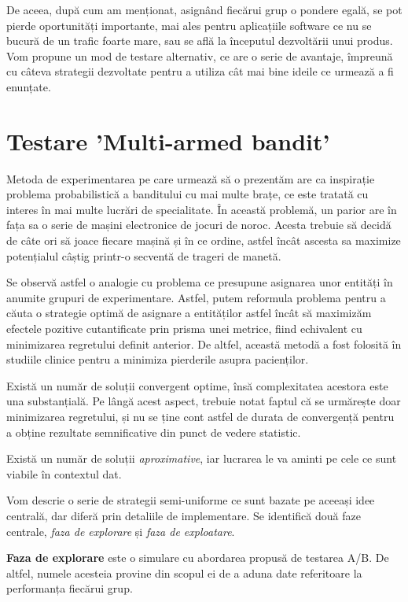 De aceea, după cum am menționat, asignând fiecărui grup o pondere egală, se pot pierde oportunități importante, mai ales pentru aplicațiile software ce nu se bucură de un trafic foarte mare, sau se află la începutul dezvoltării unui produs. Vom propune un mod de testare alternativ, ce are o serie de avantaje, împreună cu câteva strategii dezvoltate pentru a utiliza cât mai bine ideile ce urmează a fi enunțate.

\section{Testare 'Multi-armed bandit'}

Metoda de experimentarea pe care urmează să o prezentăm are ca inspirație problema probabilistică a banditului cu mai multe brațe, ce este tratată cu interes în mai multe lucrări de specialitate. În această problemă, un parior are în fața sa o serie de mașini electronice de jocuri de noroc. Acesta trebuie să decidă de câte ori să joace fiecare mașină și în ce ordine, astfel încât ascesta sa maximize potențialul câștig printr-o secventă de trageri de manetă. 

Se observă astfel o analogie cu problema ce presupune asignarea unor entități în anumite grupuri de experimentare. Astfel, putem reformula problema pentru a căuta o strategie optimă de asignare a entităților astfel încât să maximizăm efectele pozitive cutantificate prin prisma unei metrice, fiind echivalent cu minimizarea regretului definit anterior. De altfel, această metodă a fost folosită în studiile clinice pentru a minimiza pierderile asupra pacienților.

Există un număr de soluții convergent optime, însă complexitatea acestora este una substanțială. Pe lângă acest aspect, trebuie notat faptul că se urmărește doar minimizarea regretului, și nu se ține cont astfel de durata de convergență pentru a obține rezultate semnificative din punct de vedere statistic. 


Există un număr de soluții \textit{aproximative}, iar lucrarea le va aminti pe cele ce sunt viabile în contextul dat.

Vom descrie o serie de strategii semi-uniforme ce sunt bazate pe aceeași idee centrală, dar diferă prin detaliile de implementare. Se identifică două faze centrale, \textit{faza de explorare} și \textit{faza de exploatare}.

\textbf{Faza de explorare} este o simulare cu abordarea propusă de testarea A/B. De altfel, numele acesteia provine din scopul ei de a aduna date referitoare la performanța fiecărui grup.

